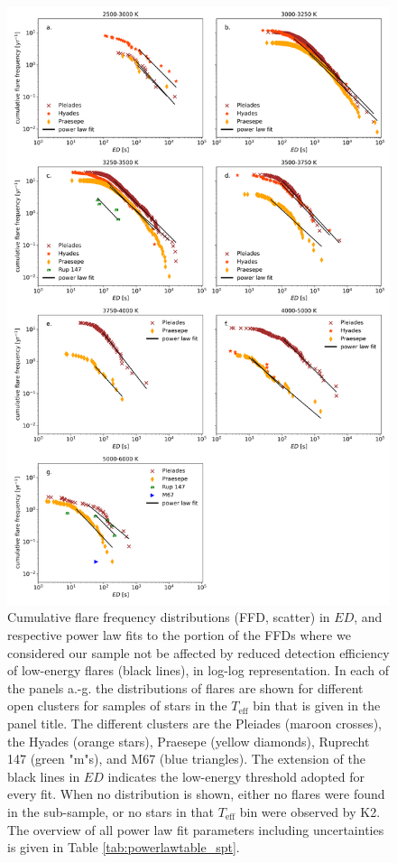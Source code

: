 \documentclass{aa}
\begin{document}
\begin{figure}[ht!]
    \centering
    \includegraphics[width=14cm]{pics/FFDs/SpT_wise_sample_ffd_ED_wheatland.png}
    \caption{Cumulative flare frequency distributions (FFD, scatter) in $ED$, and respective power law fits to the portion of the FFDs where we considered our sample not be affected by reduced detection efficiency of low-energy flares (black lines), in log-log representation. In each of the panels a.-g. the distributions of flares are shown for different open clusters for samples of stars in the $T_\mathrm{eff}$ bin that is given in the panel title. The different clusters are the Pleiades (maroon crosses), the Hyades (orange stars), Praesepe (yellow diamonds), Ruprecht 147 (green "m"s), and M67 (blue triangles). The extension of the black lines in $ED$ indicates the low-energy threshold adopted for every fit. When no distribution is shown, either no flares were found in the sub-sample, or no stars in that $T_\mathrm{eff}$ bin were observed by K2. The overview of all power law fit parameters including uncertainties is given in Table \ref{tab:powerlawtable_spt}.}       	
    \label{fig:powerlawfits_s}
\end{figure}
\end{document}
